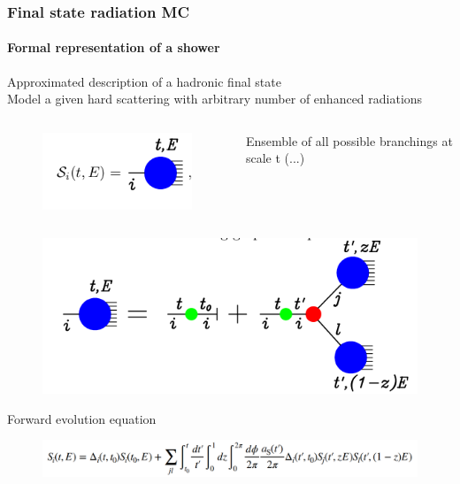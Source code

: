 \documentclass[aspectratio=43]{beamer}
\begin{document}
\begin{frame}

	\frametitle{Final state radiation MC}
	\framesubtitle{Formal representation of a shower}
	
	\footnotesize Approximated description of a hadronic final state \\
	\footnotesize Model a given hard scattering with arbitrary number of enhanced radiations
	
	\begin{columns} 
		
		
		\begin{figure}
			\includegraphics[width = 2.5 cm]{plots/shower_1.png}
		\end{figure}

		
		\footnotesize Ensemble of all possible branchings at scale t (...)

	\end{columns}

	\begin{figure}
		\includegraphics[width = 6 cm]{plots/shower_2.png}
	\end{figure}
		
	\footnotesize Forward evolution equation
	\begin{figure}
		\includegraphics[width = 10 cm]{plots/shower_2_eq.png}
	\end{figure}

\end{frame}
\end{document}
